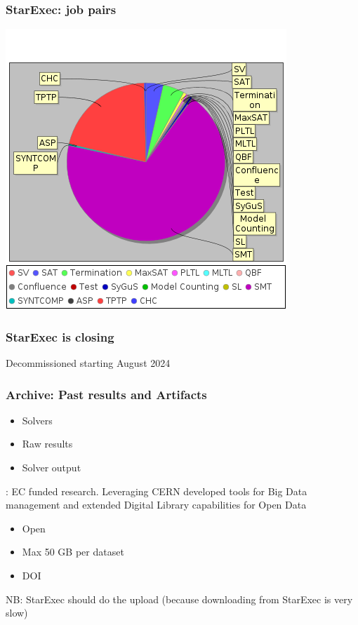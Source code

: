 \documentclass[table]{beamer}
\begin{document}
\begin{frame}
    \frametitle{StarExec: job pairs}
\begin{center}
    \includegraphics[width=\textwidth,height=\textheight,keepaspectratio]{statistics_starexec.png}    
\end{center}

\end{frame}
\begin{frame}
    \frametitle{StarExec is closing}

    \begin{center}
        
        \huge{Decommissioned starting August 2024}
    \end{center}

\end{frame}


\begin{frame}
    \frametitle{Archive: Past results and Artifacts}

    \begin{itemize}
        \item Solvers
        \item Raw results
        \item Solver output 
    \end{itemize}
    \vfill
    \pause
    \logozenodo: EC funded research. Leveraging CERN developed tools for Big Data management and extended Digital Library capabilities for Open Data
    \begin{itemize}
        \item Open
        \item Max 50 GB per dataset
        \item DOI
    \end{itemize}
\vfill
    NB: StarExec should do the upload (because downloading from StarExec is very slow)

\end{frame}
\end{document}
